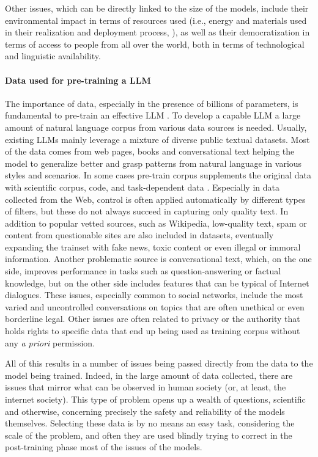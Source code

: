 Other issues, which can be directly linked to the size of the models, include their environmental impact in terms of resources used (i.e., energy and materials used in their realization and deployment process, \citep{strubell-etal-2019-energy}), as well as their democratization in terms of access to people from all over the world, both in terms of technological and linguistic availability.

\paragraph{Data used for pre-training a LLM} The importance of data, especially in the presence of billions of parameters, is fundamental to pre-train an effective LLM \citep{hoffmann2022training}. To develop a capable LLM a large amount of natural language corpus from various data sources is needed. Usually, existing LLMs mainly leverage a mixture of diverse public textual datasets. Most of the data comes from web pages, books and conversational text helping the model to generalize better and grasp patterns from natural language in various styles and scenarios. In some cases pre-train corpus supplements the original data with scientific corpus, code, and task-dependent data \citep{chowdhery2022palm, zhang2022opt}. Especially in data collected from the Web, control is often applied automatically by different types of filters, but these do not always succeed in capturing only quality text. In addition to popular vetted sources, such as Wikipedia, low-quality text, spam or content from questionable sites are also included in datasets, eventually expanding the trainset with fake news, toxic content or even illegal or immoral information. Another problematic source is conversational text, which, on the one side, improves performance in tasks such as question-answering or factual knowledge, but on the other side includes features that can be typical of Internet dialogues. These issues, especially common to social networks, include the most varied and uncontrolled conversations on topics that are often unethical or even borderline legal. Other issues are often related to privacy or the authority that holds rights to specific data that end up being used as training corpus without any \textit{a priori} permission.

All of this results in a number of issues being passed directly from the data to the model being trained. Indeed, in the large amount of data collected, there are issues that mirror what can be observed in human society (or, at least, the internet society). This type of problem opens up a wealth of questions, scientific and otherwise, concerning precisely the safety and reliability of the models themselves. Selecting these data is by no means an easy task, considering the scale of the problem, and often they are used blindly trying to correct in the post-training phase most of the issues of the models.


